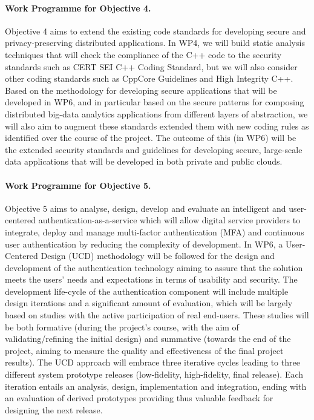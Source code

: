 \documentclass[a4paper,11pt]{article}
\begin{document}
\paragraph{Work Programme for Objective 4.}

Objective 4 aims to extend the existing code standards for developing secure and privacy-preserving distributed applications. In WP4, we will build static analysis techniques that will check the compliance of the C++ code to the security standards such as CERT SEI C++ Coding Standard, but we will also consider other coding standards such as CppCore Guidelines and High Integrity C++. Based on the methodology for developing secure applications that will be developed in WP6, and in particular based on the secure patterns for composing distributed big-data analytics applications from different layers of abstraction, we will also aim to augment these standards extended them with new coding rules as identified over the course of the project. The outcome of this (in WP6) will be the extended security standards and guidelines for developing secure, large-scale data applications that will be developed in both private and public clouds.

\paragraph{Work Programme for Objective 5.}

Objective 5 aims to analyse, design, develop and evaluate an intelligent and user-centered authentication-as-a-service which will allow digital service providers to integrate, deploy and manage multi-factor authentication (MFA) and continuous user authentication by reducing the complexity of development. In WP6, a User-Centered Design (UCD) methodology will be followed for the design and development of the authentication technology aiming to assure that the solution meets the users' needs and expectations in terms of usability and security. The development life-cycle of the authentication component will include multiple design iterations and a significant amount of evaluation, which will be largely based on studies with the active participation of real end-users. These studies will be both formative (during the project’s course, with the aim of validating/refining the initial design) and summative (towards the end of the project, aiming to measure the quality and effectiveness of the final project results). The UCD approach will embrace three iterative cycles leading to three different system prototype releases (low-fidelity, high-fidelity, final release). Each iteration entails an analysis, design, implementation and integration, ending with an evaluation of derived prototypes providing thus valuable feedback for designing the next release. 
\end{document}
